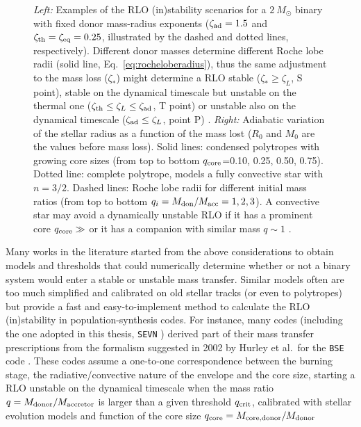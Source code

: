 \documentclass[a4paper,titlepage]{book}     	%
\newcommand{\sun}{\ensuremath{_\odot}}
\newcommand{\msun}{\ensuremath{M\sun}}
\begin{document}
\begin{figure}
\begin{minipage}{.49\textwidth}
	\end{minipage}
	\caption{\emph{Left:} Examples of the RLO (in)stability scenarios for a $\SI{2}{\msun}$ binary with fixed donor mass-radius exponents ($\zeta_\textup{ad}=1.5$ and $\zeta_\textup{th}=\zeta_\textup{eq}=0.25$, illustrated  by the dashed and dotted lines, respectively). Different donor masses determine different Roche lobe radii (solid line, Eq.\ \ref{eq:rocheloberadius}), thus the same adjustment to the mass loss ($\zeta_*$) might determine a RLO stable ($\zeta_* \geq \zeta_L$, S point), stable on the dynamical timescale but unstable on the thermal one ($\zeta_\textup{th} \leq \zeta_L \leq \zeta_\textup{ad}$, T point) or unstable also on the dynamical timescale ($\zeta_\textup{ad} \leq \zeta_L$, point P) \cite{binaries}. \emph{Right:} Adiabatic variation of the stellar radius as a function of the mass lost ($R_0$ and $M_0$ are the values before mass loss). Solid lines: condensed polytropes with growing core sizes (from top to bottom $q_\textup{core}$=0.10, 0.25, 0.50, 0.75). Dotted line: complete polytrope, models a fully convective star with $n=3/2$. Dashed lines: Roche lobe radii for different initial mass ratios (from top to bottom $q_i=M_{\rm don}/M_{\rm acc}=1,2,3$). A convective star may avoid a dynamically unstable RLO if it has a prominent core $q_{\rm core} \gg$ or it has a companion with similar mass $q \sim 1$ \cite{hjellmingwebbink1987_coreRLOF}.}\label{fig:RLOstability}
\end{figure}


Many works in the literature started from the above considerations to obtain models and thresholds that could numerically determine whether or not a binary system would enter a stable or unstable mass transfer. Similar models often are too much simplified and calibrated on old stellar tracks (or even to polytropes) but provide a fast and easy-to-implement method to calculate the RLO (in)stability in population-synthesis codes. For instance, many codes (including the one adopted in this thesis, \texttt{SEVN} \cite{spera2019_mergingBBH}) derived part of their mass transfer prescriptions from the formalism suggested in 2002 by Hurley et al.\ for the \texttt{BSE} code \cite{Hurley2002}. These codes assume a one-to-one correspondence between the burning stage, the radiative/convective nature of the envelope and the core size, starting a RLO unstable on the dynamical timescale when the mass ratio $q=M_{\rm donor}/M_{\rm accretor}$ is larger than a given threshold $q_{\rm crit}$, calibrated with stellar evolution models and function of the core size $q_{\rm core}=M_{\rm core, donor}/M_{\rm donor}$
\end{document}
